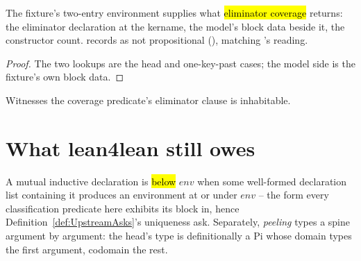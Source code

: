\begin{proposition}
\label{prop:natEnv_elimCovered}
\leanok
{}
 The  fixture's two-entry \lbox{} environment supplies what \hl{eliminator
coverage} returns: the eliminator declaration at the  kername, the model's block data
beside it, the constructor count.
  records  as not propositional (), matching 's  reading.
\end{proposition}
\begin{proof}
\leanok
{}
 The two lookups are the head and one-key-past cases; the model side is the fixture's
own block data.
\end{proof}

\begin{remark}
 Witnesses the coverage predicate's eliminator clause is inhabitable.
\end{remark}

\section{What lean4lean still owes}
\label{sec:source:upstream}

\begin{definition}
\label{def:IndBlockBelow}
\leanok
{}
 A mutual inductive declaration is \hl{below} $env$ when some well-formed
declaration list containing it produces an environment at or under $env$ -- the form every
classification predicate here exhibits its block in, hence Definition~\ref{def:UpstreamAsks}'s
uniqueness ask.
 Separately, \emph{peeling} types a spine argument by argument: the head's type is
definitionally a Pi whose domain types the first argument, codomain the rest.
\end{definition}

